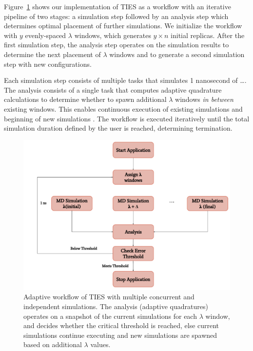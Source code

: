 Figure~\ref{fig:adaptive_ties} shows our implementation of TIES as a workflow
with an iterative pipeline of two stages: a simulation step followed by an
analysis step which determines optimal placement  of further
simulations. We initialize the workflow with $y$ evenly-spaced $\lambda$
windows, which generates $y \times n$ initial replicas. After the first
simulation step, the analysis step operates on the simulation results to
determine the next placement of $\lambda$ windows and to generate a second
simulation step with new configurations. 

Each simulation step consists of multiple tasks that simulates 1 nanosecond
of \ldots {}. The analysis
consists of a single task that computes adaptive quadrature calculations 
to determine whether to spawn
additional $\lambda$ windows \textit{in between} existing windows. This
enables continuous execution of existing simulations and beginning of new
simulations .
The workflow is executed iteratively until the total simulation duration
defined by the user is reached, determining termination.

\begin{figure}
  \centering
  \includegraphics[width=\columnwidth]{figures/adaptive_TIES_workflow_diagram.pdf}
  \caption{Adaptive workflow of TIES with multiple concurrent and independent
  simulations. The analysis (adaptive quadratures) operates on a snapshot of
  the current simulations for each $\lambda$ window, and decides whether the
  critical threshold is reached, else current simulations continue executing
  and new simulations are spawned based on additional $\lambda$ values.}
\label{fig:adaptive_ties}
\end{figure}

